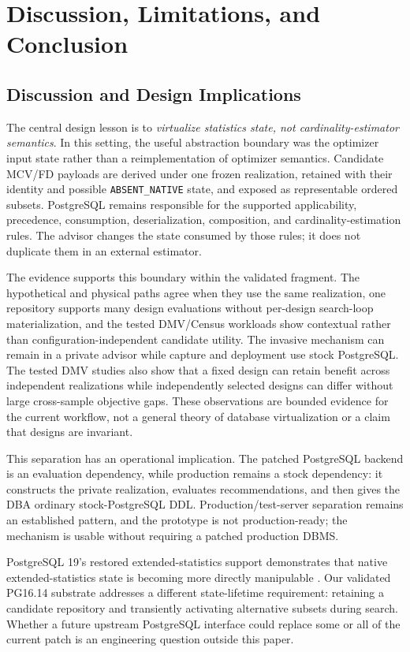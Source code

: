\section{Discussion, Limitations, and Conclusion}

\subsection{Discussion and Design Implications}

The central design lesson is to \emph{virtualize statistics state, not
cardinality-estimator semantics}.  In this setting, the useful abstraction
boundary was the optimizer input state rather than a reimplementation of
optimizer semantics.  Candidate MCV/FD payloads are derived under one frozen
realization, retained with their identity and possible
\texttt{ABSENT\_NATIVE} state, and exposed as representable ordered subsets.
PostgreSQL remains responsible for the supported applicability, precedence,
consumption, deserialization, composition, and cardinality-estimation rules.
The advisor changes the state consumed by those rules; it does not duplicate
them in an external estimator.

The evidence supports this boundary within the validated fragment.  The
hypothetical and physical paths agree when they use the same realization, one
repository supports many design evaluations without per-design search-loop
materialization, and the tested DMV/Census workloads show contextual rather
than configuration-independent candidate utility.  The invasive mechanism can
remain in a private advisor while capture and deployment use stock PostgreSQL.
The tested DMV studies also show that a fixed design can retain benefit across
independent realizations while independently selected designs can differ
without large cross-sample objective gaps.  These observations are bounded
evidence for the current workflow, not a general theory of database
virtualization or a claim that designs are invariant.

This separation has an operational implication.  The patched PostgreSQL
backend is an evaluation dependency, while production remains a stock
dependency: it constructs the private realization, evaluates recommendations,
and then gives the DBA ordinary stock-PostgreSQL DDL.  Production/test-server
separation remains an established pattern, and the prototype is not
production-ready; the mechanism is usable without requiring a patched
production DBMS.

PostgreSQL 19's restored extended-statistics support demonstrates that native
extended-statistics state is becoming more directly manipulable
\cite{postgresql19restore}.  Our validated PG16.14 substrate addresses a
different state-lifetime requirement: retaining a candidate repository and
transiently activating alternative subsets during search.  Whether a future
upstream PostgreSQL interface could replace some or all of the current patch
is an engineering question outside this paper.

